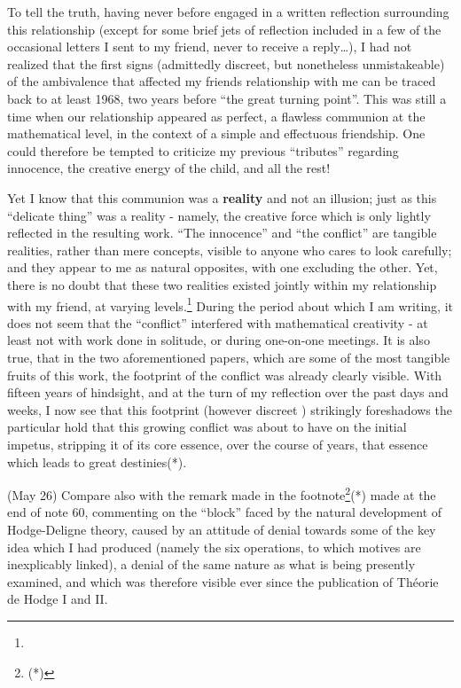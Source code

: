 To tell the truth, having never before engaged in a written reflection surrounding this
relationship (except for some brief jets of reflection included in a few of the
occasional letters I sent to my friend, never to receive a reply\ldots),
I had not realized that the first signs (admittedly discreet, but nonetheless
unmistakeable) of the ambivalence that affected my friends relationship with me can be
traced back to at least 1968, two years before ``the great turning point''.
This was still a time when our relationship appeared as perfect, a flawless communion
at the mathematical level, in the context of a simple and effectuous friendship. 
One could therefore be tempted to criticize my previous ``tributes'' regarding innocence,
the creative energy of the child, and all the rest!

Yet I know that this communion was a \textbf{reality} and not an illusion; 
just as this ``delicate thing'' was a reality - namely, the creative force which is only
lightly reflected in the resulting work. 
``The innocence'' and ``the conflict'' are tangible realities, rather than mere concepts,
visible to anyone who cares to look carefully; 
and they appear to me as natural opposites, with one excluding the other. 
Yet, there is no doubt that these two realities existed jointly within my relationship
with my friend, at varying levels.\footnote{}
During the period about which  I am writing, it does not seem that the ``conflict''
interfered with mathematical creativity - at least not with work 
done in solitude, or during one-on-one meetings.
It is also true, that in the two aforementioned papers, which are some of the most
tangible fruits of this work, the footprint of the conflict was already clearly visible. 
With fifteen years of hindsight, and at the turn of my reflection over the past days and
weeks, I now see that this footprint (however discreet ) 
strikingly foreshadows the particular hold that this growing conflict was about to 
have on the initial impetus, stripping it of its core essence, over the course of years,
that essence which leads to great destinies(*).

\label{note:63_1}
(May 26) Compare also with the remark made in the footnote\footnote{(*)}(*) made at the
end of note 60, commenting on the ``block'' faced by 
the natural development of Hodge-Deligne theory, caused by an attitude of denial 
towards some of the key idea which I had produced (namely the six operations, to which
motives are inexplicably linked), 
a denial of the same nature as what is being presently examined, and which was therefore
visible ever since the publication of Th\'eorie de Hodge I and II. 

